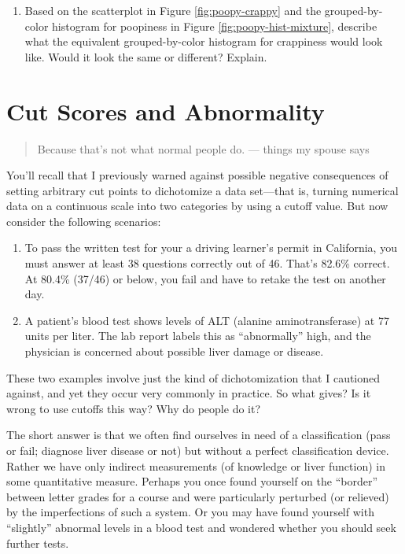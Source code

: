 \documentclass[
  openany]{book}
\providecommand{\tightlist}{%
  \setlength{\itemsep}{0pt}\setlength{\parskip}{0pt}}
\begin{document}
\begin{enumerate}
\def\labelenumi{\arabic{enumi})}
\tightlist
\item
  Based on the scatterplot in Figure \ref{fig:poopy-crappy} and the grouped-by-color histogram for poopiness in Figure \ref{fig:poopy-hist-mixture}, describe what the equivalent grouped-by-color histogram for crappiness would look like. Would it look the same or different? Explain.
\end{enumerate}

\hypertarget{cut-scores-and-abnormality}{%
\chapter{Cut Scores and Abnormality}\label{cut-scores-and-abnormality}}

\begin{quote}
Because that's not what normal people do.
--- things my spouse says
\end{quote}

You'll recall that I previously warned against possible negative consequences of setting arbitrary cut points to dichotomize a data set---that is, turning numerical data on a continuous scale into two categories by using a cutoff value. But now consider the following scenarios:

\begin{enumerate}
\def\labelenumi{\arabic{enumi})}
\item
  To pass the written test for your a driving learner's permit in California, you must answer at least 38 questions correctly out of 46. That's 82.6\% correct. At 80.4\% (37/46) or below, you fail and have to retake the test on another day.
\item
  A patient's blood test shows levels of ALT (alanine aminotransferase) at 77 units per liter. The lab report labels this as ``abnormally'' high, and the physician is concerned about possible liver damage or disease.
\end{enumerate}

These two examples involve just the kind of dichotomization that I cautioned against, and yet they occur very commonly in practice. So what gives? Is it wrong to use cutoffs this way? Why do people do it?

The short answer is that we often find ourselves in need of a classification (pass or fail; diagnose liver disease or not) but without a perfect classification device. Rather we have only indirect measurements (of knowledge or liver function) in some quantitative measure. Perhaps you once found yourself on the ``border'' between letter grades for a course and were particularly perturbed (or relieved) by the imperfections of such a system. Or you may have found yourself with ``slightly'' abnormal levels in a blood test and wondered whether you should seek further tests.
\end{document}
